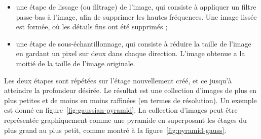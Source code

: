 \begin{itemize}
    \item une étape de lissage (ou filtrage) de l'image, qui consiste à appliquer un filtre passe-bas à l'image, afin de supprimer les hautes fréquences. Une image lissée est formée, où les détails fins ont été supprimés ;
    \item une étape de sous-échantillonnage, qui consiste à réduire la taille de l'image en gardant un pixel sur deux dans chaque direction. L'image obtenue a la moitié de la taille de l'image originale.
\end{itemize}

\bigskip

Les deux étapes sont répétées sur l'étage nouvellement créé, et ce jusqu'à atteindre la profondeur désirée. Le résultat est une collection d'images de plus en plus petites et de moins en moins raffinées (en termes de résolution). Un exemple est donné en figure~\ref{fig:gaussian-pyramid}. La collection d'images peut être représentée graphiquement comme une pyramide en superposant les étages du plus grand au plus petit, comme montré à la figure~\ref{fig:pyramid-gauss}.

\bigskip

